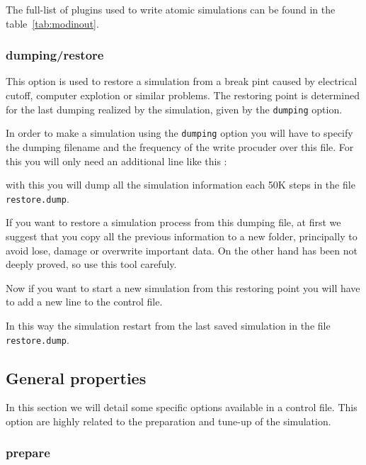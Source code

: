The full-list of plugins used to write atomic simulations can be found in the
table~\ref{tab:modinout}.

\subsubsection{dumping/restore}

This option is used to restore a simulation from a break pint caused by
electrical cutoff, computer explotion or similar problems. The restoring point
is determined for the last dumping realized by the simulation, given by the
\verb|dumping| option.

In order to make a simulation using the \verb|dumping| option you will have to
specify the dumping filename and the frequency of the write procuder over this
file. For this you will only need an additional line like this :

\noindent
with this you will dump all the simulation information each 50K steps in the
file \verb|restore.dump|.

If you want to restore a simulation process from this dumping file, at first we
suggest that you copy all the previous information to a new folder, principally
to avoid lose, damage or overwrite important data. On the other hand has been
not deeply proved, so use this tool carefuly.

Now if you want to start a new simulation from this restoring point you will
have to add a new line to the control file.


In this way the simulation restart from the last saved simulation in the file
\verb|restore.dump|.
\subsection{General properties}

In this section we will detail some specific options available in a control
file. This option are highly related to the preparation and tune-up of the
simulation.

\subsubsection{prepare}

